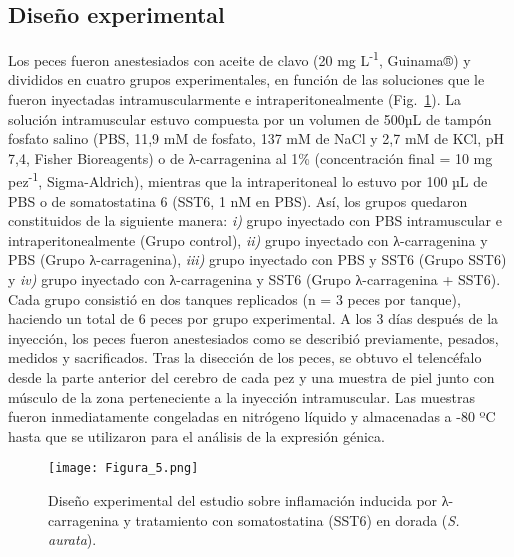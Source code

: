 \documentclass[10pt,a4paper]{article}
\begin{document}
\subsection{Diseño experimental}
Los peces fueron anestesiados con aceite de clavo (20 mg L\textsuperscript{-1}, Guinama®) y divididos en cuatro grupos experimentales, en función de las soluciones que le fueron inyectadas intramuscularmente e intraperitonealmente (Fig.~\ref{fig:5}). La solución intramuscular estuvo compuesta por un volumen de 500µL de tampón fosfato salino (PBS, 11,9 mM de fosfato, 137 mM de NaCl y 2,7 mM de KCl, pH 7,4, Fisher Bioreagents) o de λ-carragenina al 1\% (concentración final = 10 mg pez\textsuperscript{-1}, Sigma-Aldrich), mientras que la intraperitoneal lo estuvo por 100 µL de PBS o de somatostatina 6 (SST6, 1 nM en PBS). Así, los grupos quedaron constituidos de la siguiente manera: \textit{i)} grupo inyectado con PBS intramuscular e intraperitonealmente (Grupo control), \textit{ii)} grupo inyectado con λ-carragenina y PBS (Grupo λ-carragenina), \textit{iii)} grupo inyectado con PBS y SST6 (Grupo SST6) y \textit{iv)} grupo inyectado con λ-carragenina y SST6 (Grupo λ-carragenina + SST6). Cada grupo consistió en dos tanques replicados (n = 3 peces por tanque), haciendo un total de 6 peces por grupo experimental. A los 3 días después de la inyección, los peces fueron anestesiados como se describió previamente, pesados, medidos y sacrificados. Tras la disección de los peces, se obtuvo el telencéfalo desde la parte anterior del cerebro de cada pez y una muestra de piel junto con músculo de la zona perteneciente a la inyección intramuscular. Las muestras fueron inmediatamente congeladas en nitrógeno líquido y almacenadas a -80 ºC hasta que se utilizaron para el análisis de la expresión génica.

\begin{figure}[ht]
  \centering
 \texttt{[image: Figura\_5.png]}
 
  \caption{Diseño experimental del estudio sobre inflamación inducida por λ-carragenina y tratamiento con somatostatina (SST6) en dorada (\textit{S. aurata}).}
  \label{fig:5}
\end{figure}
\end{document}
